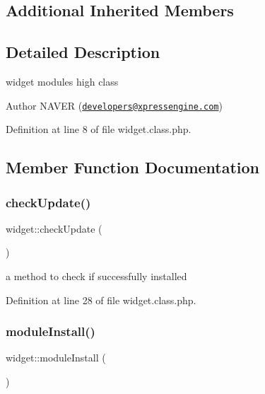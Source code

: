\subsection*{Additional Inherited Members}


\subsection{Detailed Description}
widget module\textquotesingle{}s high class 

\begin{DoxyAuthor}{Author}
N\+A\+V\+ER (\href{mailto:developers@xpressengine.com}{\tt developers@xpressengine.\+com}) 
\end{DoxyAuthor}


Definition at line 8 of file widget.\+class.\+php.



\subsection{Member Function Documentation}
\mbox{\label{classwidget_a40ce2841fc3aa0dade2ce5609c08ea9e}} 
\subsubsection{\texorpdfstring{check\+Update()}{checkUpdate()}}
{\footnotesize\ttfamily widget\+::check\+Update (\begin{DoxyParamCaption}{ }\end{DoxyParamCaption})}



a method to check if successfully installed 



Definition at line 28 of file widget.\+class.\+php.

\mbox{\label{classwidget_ae5a0f29ef320000b10196c8ce3d1bcdc}} 
\subsubsection{\texorpdfstring{module\+Install()}{moduleInstall()}}
{\footnotesize\ttfamily widget\+::module\+Install (\begin{DoxyParamCaption}{ }\end{DoxyParamCaption})}




